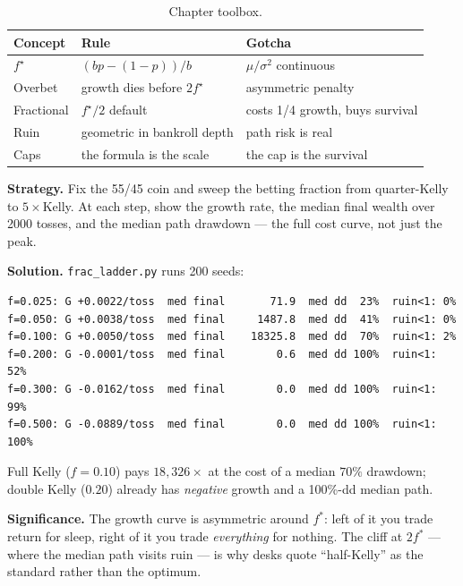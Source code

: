 \begin{table}[htbp]\centering\small
\caption{Chapter toolbox.}
\begin{tabular}{@{}lll@{}}
\toprule
Concept & Rule & Gotcha\\
\midrule
$f^\star$ & $(bp-(1-p))/b$ & $\mu/\sigma^2$ continuous\\
Overbet & growth dies before $2f^\star$ & asymmetric penalty\\
Fractional & $f^\star/2$ default & costs 1/4 growth, buys survival\\
Ruin & geometric in bankroll depth & path risk is real\\
Caps & the formula is the scale & the cap is the survival\\
\bottomrule
\end{tabular}
\end{table}

\begin{example}\label{ex:fracladder}
\textbf{Strategy.} Fix the 55/45 coin and sweep the betting
fraction from quarter-Kelly to $5\times$Kelly. At each step, show
the growth rate, the median final wealth over 2000 tosses, and the
median path drawdown --- the full cost curve, not just the peak.

\textbf{Solution.} \texttt{frac\_ladder.py} runs 200 seeds:
\begin{verbatim}
f=0.025: G +0.0022/toss  med final       71.9  med dd  23%  ruin<1: 0%
f=0.050: G +0.0038/toss  med final     1487.8  med dd  41%  ruin<1: 0%
f=0.100: G +0.0050/toss  med final    18325.8  med dd  70%  ruin<1: 2%
f=0.200: G -0.0001/toss  med final        0.6  med dd 100%  ruin<1: 52%
f=0.300: G -0.0162/toss  med final        0.0  med dd 100%  ruin<1: 99%
f=0.500: G -0.0889/toss  med final        0.0  med dd 100%  ruin<1: 100%
\end{verbatim}
Full Kelly ($f=0.10$) pays $18{,}326\times$ at the cost of a
median $70\%$ drawdown; double Kelly ($0.20$) already has
\emph{negative} growth and a 100\%-dd median path.

\textbf{Significance.} The growth curve is asymmetric around
$f^*$: left of it you trade return for sleep, right of it you
trade \emph{everything} for nothing. The cliff at $2f^*$ ---
where the median path visits ruin --- is why desks quote
``half-Kelly'' as the standard rather than the optimum.
\end{example}


